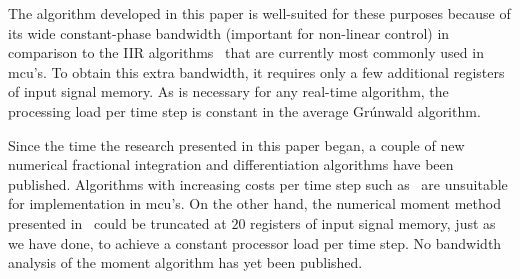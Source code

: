 The algorithm developed in this paper is well-suited for these purposes because of its wide constant-phase bandwidth (important for non-linear control) in comparison to the IIR algorithms~\cite{Romero:13} that are currently most commonly used in mcu's. To obtain this extra bandwidth, it requires only a few additional registers of input signal memory. As is necessary for any real-time algorithm, the processing load per time step is constant in the average Gr{\'u}nwald algorithm. 

Since the time the research presented in this paper began, a couple of new numerical fractional integration and differentiation algorithms have been published. Algorithms with increasing costs per time step such as~\cite{Fukunaga:13} are unsuitable for implementation in mcu's. On the other hand, the numerical moment method presented in~\cite{Pooseh:13} could be truncated at $20$ registers of input signal memory, just as we have done, to achieve a constant processor load per time step. No bandwidth analysis of the moment algorithm has yet been published. 
